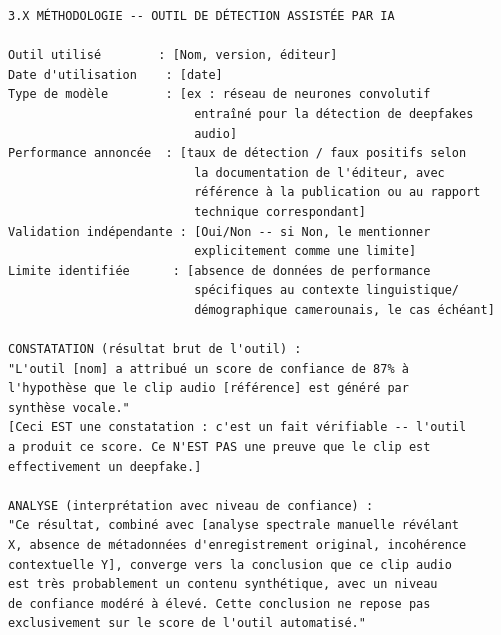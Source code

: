 \begin{lstlisting}[language=bash_forensique,
    caption={Modèle de documentation d'une analyse assistée par IA}]
3.X MÉTHODOLOGIE -- OUTIL DE DÉTECTION ASSISTÉE PAR IA

Outil utilisé        : [Nom, version, éditeur]
Date d'utilisation    : [date]
Type de modèle        : [ex : réseau de neurones convolutif
                          entraîné pour la détection de deepfakes
                          audio]
Performance annoncée  : [taux de détection / faux positifs selon
                          la documentation de l'éditeur, avec
                          référence à la publication ou au rapport
                          technique correspondant]
Validation indépendante : [Oui/Non -- si Non, le mentionner
                          explicitement comme une limite]
Limite identifiée      : [absence de données de performance
                          spécifiques au contexte linguistique/
                          démographique camerounais, le cas échéant]

CONSTATATION (résultat brut de l'outil) :
"L'outil [nom] a attribué un score de confiance de 87% à
l'hypothèse que le clip audio [référence] est généré par
synthèse vocale."
[Ceci EST une constatation : c'est un fait vérifiable -- l'outil
a produit ce score. Ce N'EST PAS une preuve que le clip est
effectivement un deepfake.]

ANALYSE (interprétation avec niveau de confiance) :
"Ce résultat, combiné avec [analyse spectrale manuelle révélant
X, absence de métadonnées d'enregistrement original, incohérence
contextuelle Y], converge vers la conclusion que ce clip audio
est très probablement un contenu synthétique, avec un niveau
de confiance modéré à élevé. Cette conclusion ne repose pas
exclusivement sur le score de l'outil automatisé."
\end{lstlisting}

\separateur

